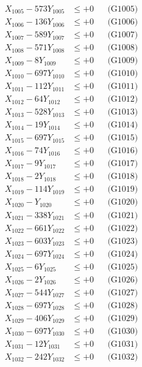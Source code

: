 \documentclass[a4paper,10pt]{article}
\begin{document}
{\begin{align}
X_{1005} - 573Y_{1005} &\leq +0 && \text{(G1005)} \\
X_{1006} - 136Y_{1006} &\leq +0 && \text{(G1006)} \\
X_{1007} - 589Y_{1007} &\leq +0 && \text{(G1007)} \\
X_{1008} - 571Y_{1008} &\leq +0 && \text{(G1008)} \\
X_{1009} - 8Y_{1009} &\leq +0 && \text{(G1009)} \\
X_{1010} - 697Y_{1010} &\leq +0 && \text{(G1010)} \\
\allowbreak
X_{1011} - 112Y_{1011} &\leq +0 && \text{(G1011)} \\
X_{1012} - 64Y_{1012} &\leq +0 && \text{(G1012)} \\
X_{1013} - 528Y_{1013} &\leq +0 && \text{(G1013)} \\
X_{1014} - 19Y_{1014} &\leq +0 && \text{(G1014)} \\
X_{1015} - 697Y_{1015} &\leq +0 && \text{(G1015)} \\
X_{1016} - 74Y_{1016} &\leq +0 && \text{(G1016)} \\
X_{1017} - 9Y_{1017} &\leq +0 && \text{(G1017)} \\
X_{1018} - 2Y_{1018} &\leq +0 && \text{(G1018)} \\
X_{1019} - 114Y_{1019} &\leq +0 && \text{(G1019)} \\
X_{1020} - Y_{1020} &\leq +0 && \text{(G1020)} \\
\allowbreak
X_{1021} - 338Y_{1021} &\leq +0 && \text{(G1021)} \\
X_{1022} - 661Y_{1022} &\leq +0 && \text{(G1022)} \\
X_{1023} - 603Y_{1023} &\leq +0 && \text{(G1023)} \\
X_{1024} - 697Y_{1024} &\leq +0 && \text{(G1024)} \\
X_{1025} - 6Y_{1025} &\leq +0 && \text{(G1025)} \\
X_{1026} - 2Y_{1026} &\leq +0 && \text{(G1026)} \\
X_{1027} - 544Y_{1027} &\leq +0 && \text{(G1027)} \\
X_{1028} - 697Y_{1028} &\leq +0 && \text{(G1028)} \\
X_{1029} - 406Y_{1029} &\leq +0 && \text{(G1029)} \\
X_{1030} - 697Y_{1030} &\leq +0 && \text{(G1030)} \\
\allowbreak
X_{1031} - 12Y_{1031} &\leq +0 && \text{(G1031)} \\
X_{1032} - 242Y_{1032} &\leq +0 && \text{(G1032)} \\

\end{align}}
\end{document}
